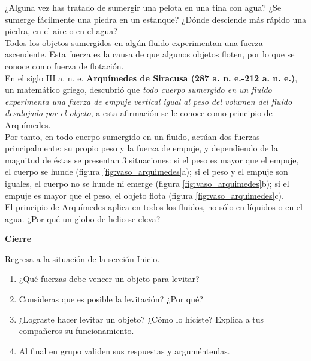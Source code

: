 \documentclass[11pt]{book}
\begin{document}
\begin{minipage}[t]{0.7\textwidth}
    ¿Alguna vez has tratado de sumergir una pelota en una tina con agua? ¿Se sumerge fácilmente una
    piedra en un estanque? ¿Dónde desciende más rápido una piedra, en el aire o en el agua?\\

    Todos los objetos sumergidos en algún fluido experimentan una fuerza ascendente. Esta fuerza es
    la causa de que algunos objetos floten, por lo que se conoce como fuerza de flotación.\\

    En el siglo III a. n. e. \textbf{Arquímedes de Siracusa (287 a. n. e.-212 a. n. e.)}, un matemático griego,
    descubrió que \emph{todo cuerpo sumergido en un fluido experimenta una fuerza de empuje vertical
        igual al peso del volumen del fluido desalojado por el objeto}, a esta afirmación se le conoce
    como principio de Arquímedes.\\

    Por tanto, en todo cuerpo sumergido en un fluido, actúan dos fuerzas principalmente: su propio
    peso y la fuerza de empuje, y dependiendo de la magnitud de éstas se presentan 3 situaciones:
    si el peso es mayor que el empuje, el cuerpo se hunde (figura \ref{fig:vaso_arquimedes}a); si el peso y el empuje son
    iguales, el cuerpo no se hunde ni emerge (figura \ref{fig:vaso_arquimedes}b); si el empuje es mayor que el peso, el
    objeto flota (figura \ref{fig:vaso_arquimedes}c).\\

    El principio de Arquímedes aplica en todos los fluidos, no sólo en líquidos o en el agua. ¿Por
    qué un globo de helio se eleva?\\
\end{minipage}

\begin{boxK}
    \begin{center}\textbf{\color{colorrds}Cierre}\end{center}
    Regresa a la situación de la sección Inicio.
    \begin{enumerate}
        \item ¿Qué fuerzas debe vencer un objeto para levitar?
        \item Consideras que es posible la levitación? ¿Por qué?
        \item ¿Lograste hacer levitar un objeto? ¿Cómo lo hiciste? Explica a tus compañeros su funcionamiento.
        \item Al final en grupo validen sus respuestas y arguméntenlas.
    \end{enumerate}
\end{boxK}
\newpage
\end{document}
